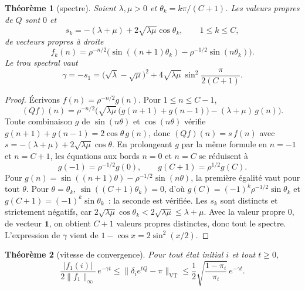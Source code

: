 \documentclass[10pt,a4paper,twocolumn]{article}
\theoremstyle{enonce}
\newtheorem{theoreme}{Théorème}[section]
\theoremstyle{defi}
\newcommand{\VT}{\mathrm{VT}}
\newcommand{\un}{\mathbf{1}}
\begin{document}
\begin{theoreme}[spectre]\label{thm:spectre}
Soient $\lambda,\mu>0$ et $\theta_k=k\pi/(C+1)$. Les valeurs propres de $Q$ sont $0$ et
\[
s_k=-(\lambda+\mu)+2\sqrt{\lambda\mu}\cos\theta_k,\qquad1\leq k\leq C,
\]
de vecteurs propres à droite
\[
f_k(n)=\rho^{-n/2}\big(\sin((n+1)\theta_k)-\rho^{-1/2}\sin(n\theta_k)\big).
\]
Le trou spectral vaut
\[
\gamma=-s_1=\big(\sqrt\lambda-\sqrt\mu\big)^2+4\sqrt{\lambda\mu}\,\sin^2\frac{\pi}{2(C+1)}.
\]
\end{theoreme}

\begin{proof}
Écrivons $f(n)=\rho^{-n/2}g(n)$. Pour $1\leq n\leq C-1$,
\[
(Qf)(n)=\rho^{-n/2}\Big(\sqrt{\lambda\mu}\,\big(g(n+1)+g(n-1)\big)-(\lambda+\mu)\,g(n)\Big).
\]
Toute combinaison $g$ de $\sin(n\theta)$ et $\cos(n\theta)$ vérifie $g(n+1)+g(n-1)=2\cos\theta\,g(n)$, donc $(Qf)(n)=s\,f(n)$ avec $s=-(\lambda+\mu)+2\sqrt{\lambda\mu}\cos\theta$. En prolongeant $g$ par la même formule en $n=-1$ et $n=C+1$, les équations aux bords $n=0$ et $n=C$ se réduisent à
\[
g(-1)=\rho^{-1/2}g(0),\qquad g(C+1)=\rho^{1/2}g(C).
\]
Pour $g(n)=\sin((n+1)\theta)-\rho^{-1/2}\sin(n\theta)$, la première égalité vaut pour tout $\theta$. Pour $\theta=\theta_k$, $\sin((C+1)\theta_k)=0$, d'où $g(C)=(-1)^k\rho^{-1/2}\sin\theta_k$ et $g(C+1)=(-1)^k\sin\theta_k$~: la seconde est vérifiée. Les $s_k$ sont distincts et strictement négatifs, car $2\sqrt{\lambda\mu}\cos\theta_k<2\sqrt{\lambda\mu}\leq\lambda+\mu$. Avec la valeur propre $0$, de vecteur $\un$, on obtient $C+1$ valeurs propres distinctes, donc tout le spectre. L'expression de $\gamma$ vient de $1-\cos x=2\sin^2(x/2)$.
\end{proof}

\begin{theoreme}[vitesse de convergence]\label{thm:vitesse}
Pour tout état initial $i$ et tout $t\geq0$,
\[
\frac{|f_1(i)|}{2\|f_1\|_\infty}\,e^{-\gamma t}\leq\|\delta_ie^{tQ}-\pi\|_\VT\leq\frac12\sqrt{\frac{1-\pi_i}{\pi_i}}\,e^{-\gamma t}.
\]
\end{theoreme}
\end{document}
